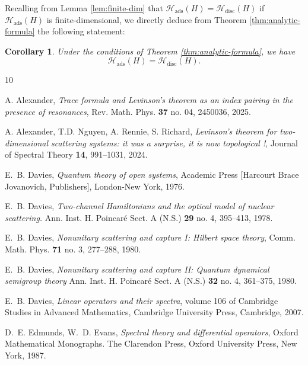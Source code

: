 \documentclass{article}
\def\H{\mathcal H}
\def\disc{{\mathrm{disc}}}
\def\ads{{\mathrm{ads}}}
\newtheorem{Corollary}[Theorem]{Corollary}
\begin{document}
Recalling from Lemma \ref{lem:finite-dim} that $\H_\ads(H)=\H_\disc(H)$ if $\H_\ads(H)$ is finite-dimensional, we directly deduce from Theorem \ref{thm:analytic-formula} the following statement:

\begin{Corollary}
Under the conditions of Theorem \ref{thm:analytic-formula}, we have
\begin{equation*}
\H_\ads(H)=\H_\disc(H).
\end{equation*}
\end{Corollary}

%

\begin{thebibliography}{10}

A. Alexander, 
\emph{Trace formula and Levinson’s theorem as an index pairing in the
presence of resonances},
Rev. Math. Phys. {\bf 37} no. 04, 2450036, 2025. 

A. Alexander, T.D. Nguyen, A. Rennie, S. Richard, 
\emph{Levinson's theorem for two-dimensional scattering systems: it was a surprise, it is now topological !},
Journal of Spectral Theory {\bf 14}, 991--1031, 2024. 

E.~B. Davies,
\emph{Quantum theory of open systems},
Academic Press [Harcourt Brace Jovanovich, Publishers], London-New York, 1976.

E.~B. Davies,
\emph{Two-channel {H}amiltonians and the optical model of nuclear scattering.}
Ann. Inst. H. Poincar\'e Sect. A (N.S.) {\bf 29} no. 4, 395--413, 1978.

E.~B. Davies,
\emph{Nonunitary scattering and capture I: {H}ilbert space theory},
Comm. Math. Phys. {\bf 71} no. 3, 277--288, 1980.

E.~B. Davies,
\emph{Nonunitary scattering and capture II: {Q}uantum dynamical
semigroup theory}
Ann. Inst. H. Poincar\'e Sect. A (N.S.) {\bf 32} no. 4, 361--375, 1980.

E.~B. Davies,
\emph{Linear operators and their spectra}, volume 106 of 
Cambridge Studies in Advanced Mathematics,
Cambridge University Press, Cambridge, 2007.

D.~E. Edmunds, W.~D. Evans,
\emph{Spectral theory and differential operators},
Oxford Mathematical Monographs. The Clarendon Press, Oxford University Press, New York, 1987.


\end{thebibliography}
\end{document}
